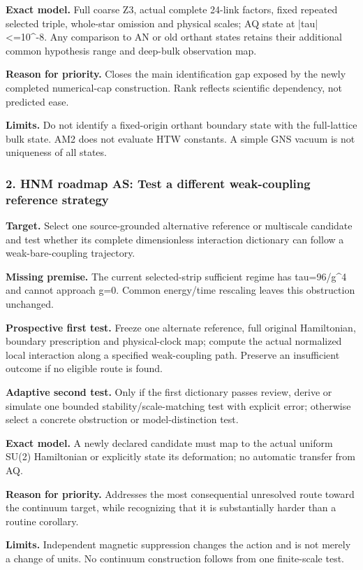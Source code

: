 \textbf{Exact model.} Full coarse Z3, actual complete 24-link factors, fixed repeated selected triple, whole-star omission and physical scales; AQ state at |tau|<=10\textasciicircum{}-8. Any comparison to AN or old orthant states retains their additional common hypothesis range and deep-bulk observation map.

\textbf{Reason for priority.} Closes the main identification gap exposed by the newly completed numerical-cap construction. Rank reflects scientific dependency, not predicted ease.

\textbf{Limits.} Do not identify a fixed-origin orthant boundary state with the full-lattice bulk state. AM2 does not evaluate HTW constants. A simple GNS vacuum is not uniqueness of all states.

\subsubsection{2. HNM roadmap AS: Test a different weak-coupling reference strategy}
\textbf{Target.} Select one source-grounded alternative reference or multiscale candidate and test whether its complete dimensionless interaction dictionary can follow a weak-bare-coupling trajectory.

\textbf{Missing premise.} The current selected-strip sufficient regime has tau=96/g\textasciicircum{}4 and cannot approach g=0. Common energy/time rescaling leaves this obstruction unchanged.

\textbf{Prospective first test.} Freeze one alternate reference, full original Hamiltonian, boundary prescription and physical-clock map; compute the actual normalized local interaction along a specified weak-coupling path. Preserve an insufficient outcome if no eligible route is found.

\textbf{Adaptive second test.} Only if the first dictionary passes review, derive or simulate one bounded stability/scale-matching test with explicit error; otherwise select a concrete obstruction or model-distinction test.

\textbf{Exact model.} A newly declared candidate must map to the actual uniform SU(2) Hamiltonian or explicitly state its deformation; no automatic transfer from AQ.

\textbf{Reason for priority.} Addresses the most consequential unresolved route toward the continuum target, while recognizing that it is substantially harder than a routine corollary.

\textbf{Limits.} Independent magnetic suppression changes the action and is not merely a change of units. No continuum construction follows from one finite-scale test.

